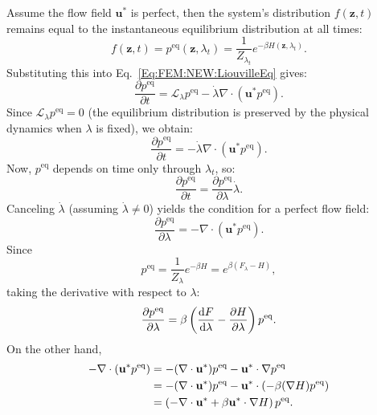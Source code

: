 Assume the flow field $\mathbf{u}^*$ is perfect, then the system's distribution $f(\mathbf{z},t)$ remains equal to the instantaneous equilibrium distribution at all times:
\begin{equation}
	f(\mathbf{z},t) = p^{\text{eq}}(\mathbf{z},\lambda_t) = \frac{1}{Z_{\lambda_t}} e^{-\beta H(\mathbf{z},\lambda_t)}.
\end{equation}
Substituting this into Eq.~\ref{Eq:FEM:NEW:LiouvilleEq} gives:
\begin{equation}
	\frac{\partial p^{\text{eq}}}{\partial t} = \mathcal{L}_\lambda p^{\text{eq}} - \dot{\lambda} \nabla \cdot (\mathbf{u}^* p^{\text{eq}}).
\end{equation}
Since $\mathcal{L}_\lambda p^{\text{eq}} = 0$ (the equilibrium distribution is preserved by the physical dynamics when $\lambda$ is fixed), we obtain:
\begin{equation}
	\frac{\partial p^{\text{eq}}}{\partial t} = - \dot{\lambda} \nabla \cdot (\mathbf{u}^* p^{\text{eq}}).
\end{equation}
Now, $p^{\text{eq}}$ depends on time only through $\lambda_t$, so:
\begin{equation}
	\frac{\partial p^{\text{eq}}}{\partial t} = \frac{\partial p^{\text{eq}}}{\partial \lambda} \dot{\lambda}.
\end{equation}
Canceling $\dot{\lambda}$ (assuming $\dot{\lambda} \neq 0$) yields the condition for a perfect flow field:
\begin{equation}
	\frac{\partial p^{\text{eq}}}{\partial \lambda} = - \nabla \cdot (\mathbf{u}^* p^{\text{eq}}).
\end{equation}
Since
\begin{equation}
	p^{\text{eq}} = \frac{1}{Z_\lambda} e^{-\beta H} = e^{\beta(F_\lambda - H)},
\end{equation}
taking the derivative with respect to $\lambda$:
\begin{equation}
	\frac{\partial p^{\text{eq}}}{\partial \lambda} = \beta \left( \frac{\mathop{}\!\mathrm{d} F}{\mathop{}\!\mathrm{d} \lambda} - \frac{\partial H}{\partial \lambda} \right) p^{\text{eq}}.
\end{equation}
On the other hand,
\begin{align}
	- \nabla \cdot (\mathbf{u}^* p^{\text{eq}}) &= - (\nabla \cdot \mathbf{u}^*) p^{\text{eq}} - \mathbf{u}^* \cdot \nabla p^{\text{eq}} \notag\\
	&= - (\nabla \cdot \mathbf{u}^*) p^{\text{eq}} - \mathbf{u}^* \cdot \left( -\beta (\nabla H) p^{\text{eq}} \right) \notag\\
	&= \left( -\nabla \cdot \mathbf{u}^* + \beta \mathbf{u}^* \cdot \nabla H \right) p^{\text{eq}}.
\end{align}
